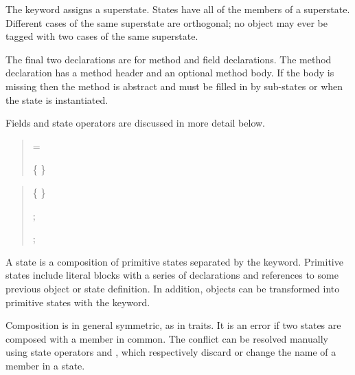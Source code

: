 The   keyword assigns a superstate. States have 
all of the members of a superstate. Different cases of the same superstate 
are orthogonal; no object may ever be tagged with two cases of the same superstate.

The final two declarations are for method and field declarations.  The
method declaration has a method header
and an optional method body.  If the body is missing then
the method is abstract and must be filled in by sub-states or when the
state is instantiated.

Fields and state operators are discussed in more detail below.

\pagebreak

\begin{quote}


 = 

 \{  \}

\end{quote}

\begin{quote}


 {}  %


 {} 

 \{  \}

 {} 


 {}  ;

 {}    ;

\end{quote}

A state is a composition of primitive states separated by the
 keyword.   Primitive states include literal blocks
with a series of declarations and references to some
previous object or state definition. In addition, objects can be transformed into primitive states
with the  keyword. 

Composition is in general symmetric, as in traits.  It is an error if two states are composed with a member in common. 
The conflict can be resolved manually using state operators  and , which
respectively discard or change the name of a member in a state. 



